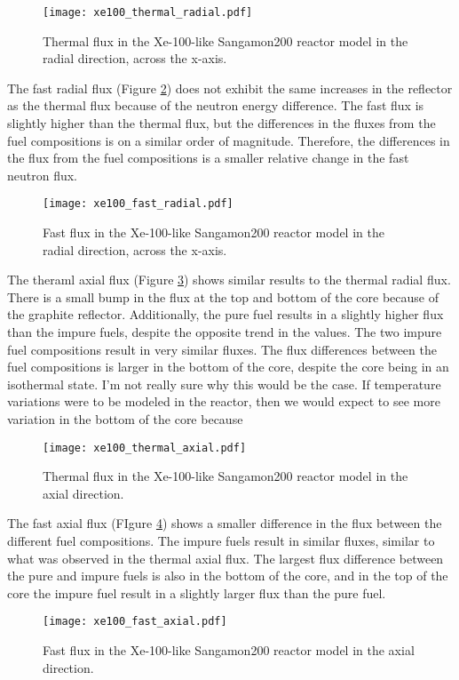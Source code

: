 \begin{figure}
        \centering 
        \texttt{[image: xe100\_thermal\_radial.pdf]}
        \caption{Thermal flux in the Xe-100-like Sangamon200 
        reactor model in the radial direction, across the 
        x-axis.}
        \label{fig:xe100_thermal_radial}
\end{figure}

The fast radial flux (Figure \ref{fig:xe100_fast_radial}) does not 
exhibit the same increases in the reflector as the thermal flux 
because of the neutron energy difference. The fast flux is slightly 
higher than the thermal flux, but the differences in the fluxes from 
the fuel compositions is on a similar order of magnitude. Therefore, 
the differences in the flux from the fuel compositions is a smaller 
relative change in the fast neutron flux. 

\begin{figure}
        \centering 
        \texttt{[image: xe100\_fast\_radial.pdf]}
        \caption{Fast flux in the Xe-100-like Sangamon200 
        reactor model in the radial direction, across the 
        x-axis.}
        \label{fig:xe100_fast_radial}
\end{figure}

The theraml axial flux (Figure \ref{fig:xe100_thermal_axial}) shows 
similar results to the thermal radial flux. There is a small bump in the 
flux at the top and bottom of the core because of the graphite reflector.
Additionally, the pure fuel results in a slightly higher flux than 
the impure fuels, despite the opposite trend in the \keff values. The 
two impure fuel compositions result in very similar fluxes. The flux 
differences between the fuel compositions is larger in the bottom 
of the core, despite the core being in an isothermal state. I'm not really 
sure why this would be the case. If temperature variations were to be modeled 
in the reactor, then we would expect to see more variation in the bottom of 
the core because 
\begin{figure}
        \centering 
        \texttt{[image: xe100\_thermal\_axial.pdf]}
        \caption{Thermal flux in the Xe-100-like Sangamon200 
        reactor model in the axial direction.}
        \label{fig:xe100_thermal_axial}
\end{figure}

The fast axial flux (FIgure \ref{fig:xe100_fast_axial}) shows a smaller 
difference in the flux between the different fuel compositions. The 
impure fuels result in similar fluxes, similar to what was observed in 
the thermal axial flux. The largest flux difference between the pure 
and impure fuels is also in the bottom of the core, and in the top 
of the core the impure fuel result in a slightly larger flux than the pure 
fuel. 
\begin{figure}
        \centering 
        \texttt{[image: xe100\_fast\_axial.pdf]}
        \caption{Fast flux in the Xe-100-like Sangamon200 
        reactor model in the axial direction.}
        \label{fig:xe100_fast_axial}
\end{figure}

